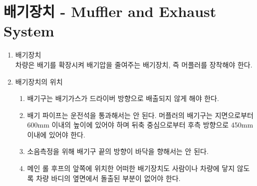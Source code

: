 \documentclass[final,a4paper,10pt]{report}
\begin{document}
\section{배기장치 - Muffler and Exhaust System}\label{rule:formula-technical.exhaust-system} \label{section:배기장치}
\begin{enumerate}
  \item\label{rule:formula-technical.exhaust-system.muffler-required} 배기장치\\
    차량은 배기를 확장시켜 배기압을 줄여주는 배기장치, 즉 머플러를 장착해야 한다.

  \item\label{rule:formula-technical.exhaust-system.positioning} 배기장치의 위치
    \begin{enumerate}
      \item\label{rule:formula-technical.exhaust-system.positioning.not-directed-at-driver} 배기구는 배기가스가 드라이버 방향으로 배출되지 않게 해야 한다.
      \item\label{rule:formula-technical.exhaust-system.positioning.routing-and-outlet-limits} 배기 파이프는 운전석을 통과해서는 안 된다. 머플러의 배기구는 지면으로부터 600mm 이내의 높이에 있어야 하며 뒤축 중심으로부터 후측 방향으로 450mm 이내에 있어야 한다.
      \item\label{rule:formula-technical.exhaust-system.positioning.not-directed-at-ground} 소음측정을 위해 배기구 끝의 방향이 바닥을 향해서는 안 된다.
      \item\label{rule:formula-technical.exhaust-system.positioning.no-protrusion-near-hoop} 메인 롤 후프의 앞쪽에 위치한 어떠한 배기장치도 사람이나 차량에 닿지 않도록 차량 바디의 옆면에서 돌출된 부분이 없어야 한다.
    \end{enumerate}


\end{enumerate}
\end{document}
